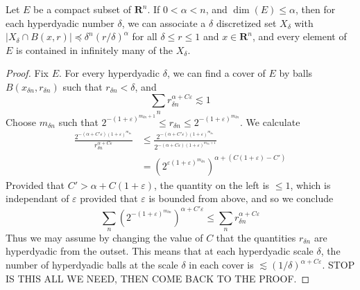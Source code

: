 \begin{theorem}
    Let $E$ be a compact subset of $\mathbf{R}^n$. If $0 < \alpha < n$, and $\dim(E) \leq \alpha$, then for each hyperdyadic number $\delta$, we can associate a $\delta$ discretized set $X_\delta$ with $|X_\delta \cap B(x,r)| \preccurlyeq \delta^n (r/\delta)^\alpha$ for all $\delta \leq r \leq 1$ and $x \in \mathbf{R}^n$, and every element of $E$ is contained in infinitely many of the $X_\delta$.
\end{theorem}
\begin{proof}
    Fix $E$. For every hyperdyadic $\delta$, we can find a cover of $E$ by balls $B(x_{\delta n}, r_{\delta n})$ such that $r_{\delta n} < \delta$, and
    \begin{equation} \sum_n r_{\delta n}^{\alpha + C\varepsilon} \lesssim 1 \end{equation}
    Choose $m_{\delta n}$ such that $2^{-(1 + \varepsilon)^{m_{\delta n}+1}} \leq r_{\delta n} \leq 2^{-(1 + \varepsilon)^{m_{\delta n}}}$. We calculate
    \begin{align*}
        \frac{2^{-(\alpha + C'\varepsilon) (1 + \varepsilon)^{m_{\delta n}}}}{r_{\delta n}^{\alpha + C\varepsilon}} &\leq \frac{2^{- (\alpha + C'\varepsilon) (1 + \varepsilon)^{m_{\delta n}}}}{2^{- (\alpha + C\varepsilon) (1 + \varepsilon)^{m_{\delta n} + 1}}}\\
        &= \left( 2^{\varepsilon (1 + \varepsilon)^{m_{\delta n}}} \right)^{\alpha + (C (1 + \varepsilon) - C')}
    \end{align*}
    Provided that $C' > \alpha + C(1 + \varepsilon)$, the quantity on the left is $\leq 1$, which is independant of $\varepsilon$ provided that $\varepsilon$ is bounded from above, and so we conclude
    \[ \sum_n \left( 2^{-(1 + \varepsilon)^{m_{\delta n}}} \right)^{\alpha + C' \varepsilon} \leq \sum_n r_{\delta n}^{\alpha + C\varepsilon} \]
    Thus we may assume by changing the value of $C$ that the quantities $r_{\delta n}$ are hyperdyadic from the outset. This means that at each hyperdyadic scale $\delta$, the number of hyperdyadic balls at the scale $\delta$ in each cover is $\lesssim (1/\delta)^{\alpha + C\varepsilon}$. STOP IS THIS ALL WE NEED, THEN COME BACK TO THE PROOF.



\end{proof}
